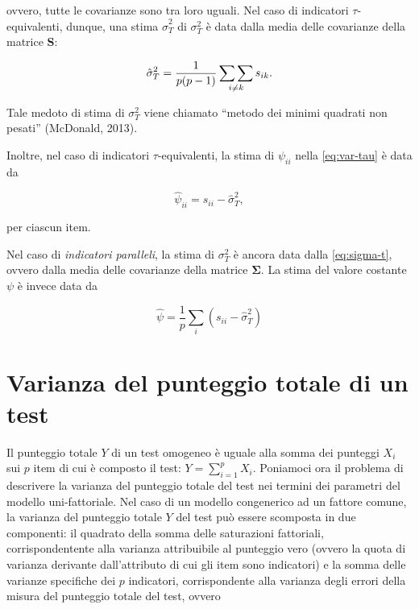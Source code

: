 \documentclass[
  11pt,
]{krantz}
\theoremstyle{definition}
\theoremstyle{definition}
\theoremstyle{definition}
\theoremstyle{definition}
\theoremstyle{remark}
\begin{document}
ovvero, tutte le covarianze sono tra loro uguali. Nel caso di indicatori \(\tau\)-equivalenti, dunque, una stima \(\hat{\sigma}^2_T\) di \(\sigma^2_T\) è data dalla media delle covarianze della matrice \textbf{S}:

\begin{equation}
\hat{\sigma}_T^2 = \frac{1}{p(p-1)} \sideset{}{} {\sum \sum}_{i \neq k} s_{ik}.
\label{eq:sigma-t}
\end{equation}

Tale medoto di stima di \(\sigma^2_T\) viene chiamato ``metodo dei minimi quadrati non pesati'' (McDonald, 2013).

Inoltre, nel caso di indicatori \(\tau\)-equivalenti, la stima di \(\psi_{ii}\) nella \eqref{eq:var-tau} è data da

\[
\hat{\psi}_{ii }= s_{ii} - \hat{\sigma}_T^2,
\]

per ciascun item.

Nel caso di \emph{indicatori paralleli}, la stima di \(\sigma^2_T\) è ancora data dalla \eqref{eq:sigma-t}, ovvero dalla media delle covarianze della matrice \(\boldsymbol{\Sigma}\). La stima del valore costante \(\psi\) è invece data da

\begin{equation}
\hat{\psi} = \frac{1}{p} \sum_i (s_{ii} - \hat{\sigma}_T^2)
\label{eq:psi-par-st}
\end{equation}

\hypertarget{varianza-del-punteggio-totale-di-un-test}{%
\section{Varianza del punteggio totale di un test}\label{varianza-del-punteggio-totale-di-un-test}}

Il punteggio totale \(Y\) di un test omogeneo è uguale alla somma dei punteggi \(X_i\) sui \(p\) item di cui è composto il test: \(Y = \sum_{i=1}^p X_i.\) Poniamoci ora il problema di descrivere la varianza del punteggio totale del test nei termini dei parametri del modello uni-fattoriale. Nel caso di un modello congenerico ad un fattore comune, la varianza del punteggio totale \(Y\) del test può essere scomposta in due componenti: il quadrato della somma delle saturazioni fattoriali, corrispondentente alla varianza attribuibile al punteggio vero (ovvero la quota di varianza derivante dall'attributo di cui gli item sono indicatori) e la somma delle varianze specifiche dei \(p\) indicatori, corrispondente alla varianza degli errori della misura del punteggio totale del test, ovvero
\end{document}
